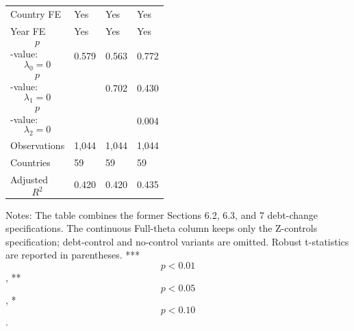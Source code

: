 \begin{table}[H]
\begin{threeparttable}
\begin{tabularx}{\textwidth}{lYYY}
Country FE & Yes & Yes & Yes \\
Year FE & Yes & Yes & Yes \\
$$p$$-value: $$\lambda_0=0$$ & 0.579 & 0.563 & 0.772 \\
$$p$$-value: $$\lambda_1=0$$ &  & 0.702 & 0.430 \\
$$p$$-value: $$\lambda_2=0$$ &  &  & 0.004 \\
Observations & 1,044 & 1,044 & 1,044 \\
Countries & 59 & 59 & 59 \\
Adjusted $$R^2$$ & 0.420 & 0.420 & 0.435 \\
\bottomrule
\end{tabularx}
\begin{tablenotes}[flushleft]\footnotesize
\item Notes: The table combines the former Sections 6.2, 6.3, and 7 debt-change specifications. The continuous Full-theta column keeps only the Z-controls specification; debt-control and no-control variants are omitted. Robust t-statistics are reported in parentheses. *** $$p<0.01$$, ** $$p<0.05$$, * $$p<0.10$$.
\end{tablenotes}
\end{threeparttable}
\end{table}
